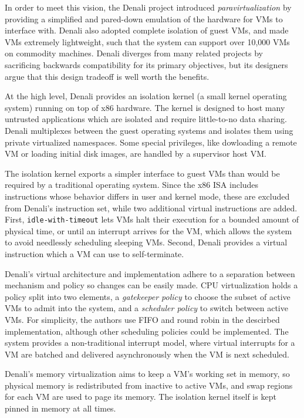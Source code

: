 \documentclass[letterpaper, twocolumn]{article}
\begin{document}
In order to meet this vision, the Denali project introduced \emph{paravirtualization} by providing
a simplified and pared-down emulation of the hardware for VMs to interface with.  Denali also
adopted complete isolation of guest VMs, and made VMs extremely lightweight, such that the system can
support over 10,000 VMs on commodity machines. Denali diverges from many 
related projects by sacrificing backwards compatibility for its primary objectives,
but its designers argue that this design tradeoff is well worth the benefits.

At the high level, Denali provides an isolation kernel (a small kernel operating system) running
on top of x86 hardware. The kernel is designed to host many untrusted applications which are isolated
and require little-to-no data sharing. Denali multiplexes between the guest operating systems and isolates them
using private virtualized namespaces. Some special privileges, like dowloading a remote VM or loading initial
disk images, are handled by a supervisor host VM.

The isolation kernel exports a simpler interface to guest VMs than would be required by a
traditional operating system.  Since the x86 ISA includes instructions whose behavior differs
in user and kernel mode, these are excluded from Denali's instruction set,
while two additional virtual instructions are added.
First, \verb+idle-with-timeout+ lets VMs halt their execution
for a bounded amount of physical time, or until an interrupt arrives for the VM,
which allows the system to avoid needlessly scheduling sleeping VMs.
Second, Denali provides a virtual instruction which a VM can use to self-terminate.

Denali's virtual architecture and implementation adhere to a separation between mechanism and policy 
so changes can be easily made. CPU virtualization holds a policy split into two elements, 
a \emph{gatekeeper policy} to choose the subset of active VMs to admit into the system, and 
a \emph{scheduler policy} to switch between active VMs. For simplicity, the authors use FIFO
and round robin in the descirbed implementation, although other scheduling policies could
be implemented.  The system provides a non-traditional interrupt model, where virtual interrupts
for a VM are batched and delivered asynchronously when the VM is next scheduled.

Denali's memory virtualization aims to keep a VM's working set in memory, so physical memory 
is redistributed from inactive to active VMs, and swap regions for each VM are used to page its memory.
The isolation kernel itself is kept pinned in memory at all times.
\end{document}
